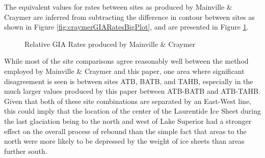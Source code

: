 The equivalent values for rates between sites as produced by Mainville \& Craymer
are inferred from subtracting the difference in contour between sites as shown in
Figure \ref{fig:craymerGIARatesBigPlot}, and are presented in Figure \ref{fig:craymerGIARates}.

\begin{figure}[h]
	\caption{Relative GIA Rates produced by Mainville \& Craymer}
	\label{fig:craymerGIARates}
\end{figure}
\newpage

While most of the site comparisons agree reasonably well between the method
employed by Mainville \& Craymer and this paper, one area where significant
disagreement is seen is between sites ATB, BATB, and TAHB, especially in the much
larger values produced by this paper between ATB-BATB and ATB-TAHB. Given that both
of these site combinations are separated by an East-West line, this could imply
that the location of the center of the Laurentide Ice Sheet during the last glaciation being to the
north and west of Lake Superior had a stronger effect on the overall process of
rebound than the simple fact that areas to the north were more likely to be
depressed by the weight of ice sheets than areas further south.

